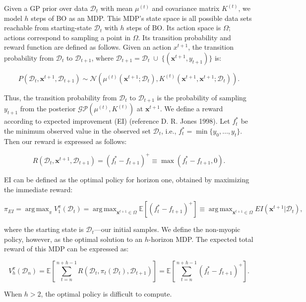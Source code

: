 \documentclass{article}
\DeclareMathOperator*{\argmax}{arg\,max}
\begin{document}
Given a GP prior over data $\mathcal{D}_t$ with mean $\mu^{(t)}$ and covariance matrix $K^{(t)}$, we 
model $h$ steps of BO as an MDP. This MDP’s state space is all possible data sets reachable from 
starting-state $\mathcal{D}_t$ with $h$ steps of BO. Its action space is $\Omega$; actions 
correspond to sampling a point in $\Omega$. Its transition probability and reward function are 
defined as follows. Given an action $x^{t+1}$, the transition probability from $\mathcal{D}_t$ to 
$\mathcal{D}_{t+1}$, where $\mathcal{D}_{t+1} = \mathcal{D}_t \;\cup\; \{(\textbf{x}^{t+1}, 
y_{t+1})\}$ is:

$$
P(\mathcal{D}_t, \textbf{x}^{t+1}, \mathcal{D}_{t+1}) \sim 
\mathcal{N}(\mu^{(t)}(\textbf{x}^{t+1};\mathcal{D}_t),K^{(t)}(\textbf{x}^{t+1}, 
\textbf{x}^{t+1};\mathcal{D}_t)).
$$

Thus, the transition probability from $\mathcal{D}_t$ to $\mathcal{D}_{t+1}$ is the probability of 
sampling $y_{t+1}$ from the posterior $\mathcal{GP}(\mu^{(t)}, K^{(t)})$ at $\textbf{x}^{t+1}$. We 
define a reward according to expected improvement (EI) (reference D. R. Jones 1998). Let $f^*_t$ be 
the minimum observed value in the observed set $\mathcal{D}_t$, i.e., $f^*_t = \min\{y_0, \dots, 
y_t\}$. Then our reward is expressed as follows:

$$
R(\mathcal{D}_t, \textbf{x}^{t+1}, \mathcal{D}_{t+1}) = (f^*_t-f_{t+1})^+ \equiv \max(f^*_t-f_{t+1}, 
0).
$$

EI can be defined as the optimal policy for horizon one, obtained by maximizing the immediate reward:

$$
\pi_{EI} = \argmax_\pi V_1^\pi(\mathcal{D}_t) = \argmax_{\textbf{x}^{t+1} \in \Omega} \mathbb{E}\left[ 
(f_t^*-f_{t+1})^+ \right] \equiv \argmax_{\textbf{x}^{t+1}\in\Omega} EI(\textbf{x}^{t+1}|\mathcal{D}_{t}),
$$

where the starting state is $\mathcal{D}_t$—our initial samples. We define the non-myopic policy, 
however, as the optimal solution to an $h$-horizon MDP. The expected total reward of this MDP can be 
expressed as:

$$
V_h^\pi(\mathcal{D}_n) = \mathbb{E}\left[ \sum_{t=n}^{n+h-1} R(\mathcal{D}_t, \pi_t(\mathcal{D}_t), 
\mathcal{D}_{t+1})\right] = \mathbb{E}\left[ \sum_{t=n}^{n+h-1} (f_t^* - f_{t+1})^+\right].
$$

When $h>2$, the optimal policy is difficult to compute.
\end{document}
